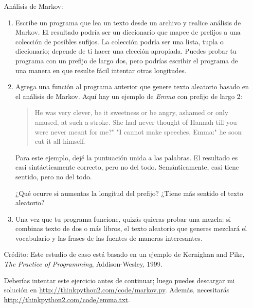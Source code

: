 \documentclass[10pt]{book}
\begin{document}
\begin{exercise}

Análisis de Markov:

\begin{enumerate}

\item Escribe un programa que lea un texto desde un archivo y realice análisis
de Markov.  El resultado podría ser un diccionario que mapee de
prefijos a una colección de posibles sufijos.  La colección
podría ser una lista, tupla o diccionario; depende de ti hacer
una elección apropiada.  Puedes probar tu programa con un prefijo
de largo dos, pero podrías escribir el programa de una manera en que resulte
fácil intentar otras longitudes.

\item Agrega una función al programa anterior que genere texto aleatorio
basado en el análisis de Markov.  Aquí hay un ejemplo de {\em Emma}
con prefijo de largo 2:

\begin{quote}
He was very clever, be it sweetness or be angry, ashamed or only
amused, at such a stroke. She had never thought of Hannah till you
were never meant for me?" "I cannot make speeches, Emma:" he soon cut
it all himself.
\end{quote}

Para este ejemplo, dejé la puntuación unida a las palabras.
El resultado es casi sintácticamente correcto, pero no del todo.
Semánticamente, casi tiene sentido, pero no del todo.

¿Qué ocurre si aumentas la longitud del prefijo?  ¿Tiene más sentido
el texto aleatorio?

\item Una vez que tu programa funcione, quizás quieras probar una mezcla:
si combinas texto de dos o más libros, el texto aleatorio
que generes mezclará el vocabulario y las frases de
las fuentes de maneras interesantes.

\end{enumerate}

Crédito: Este estudio de caso está basado en un ejemplo de Kernighan and
Pike, {\em The Practice of Programming}, Addison-Wesley, 1999.

\end{exercise}

Deberías intentar este ejercicio antes de continuar; luego puedes
descargar mi solución en \url{http://thinkpython2.com/code/markov.py}.
Además, necesitarás \url{http://thinkpython2.com/code/emma.txt}.
\end{document}
